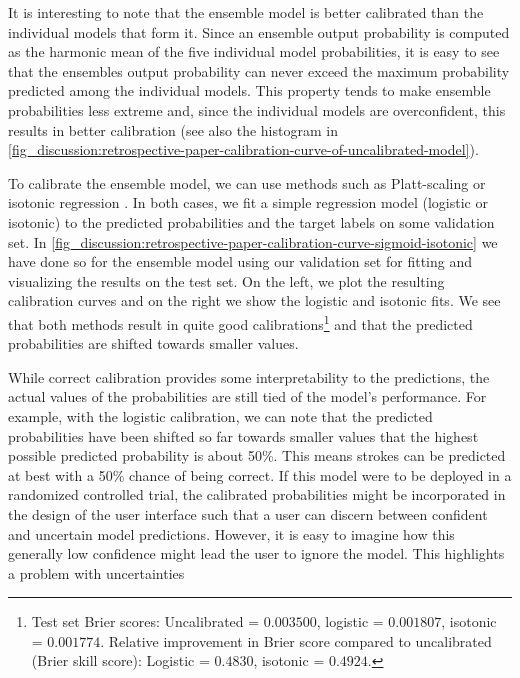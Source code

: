 It is interesting to note that the ensemble model is better calibrated than the individual models that form it. Since an ensemble output probability is computed as the harmonic mean of the five individual model probabilities, it is easy to see that the ensembles output probability can never exceed the maximum probability predicted among the individual models. This property tends to make ensemble probabilities less extreme and, since the individual models are overconfident, this results in better calibration (see also the histogram in \cref{fig_discussion:retrospective-paper-calibration-curve-of-uncalibrated-model}). 

To calibrate the ensemble model, we can use methods such as Platt-scaling \parencite{platt_probabilistic_1999} or isotonic regression \parencite{zadrozny_transforming_2002}. 
In both cases, we fit a simple regression model (logistic or isotonic) to the predicted probabilities and the target labels on some validation set. 
In \cref{fig_discussion:retrospective-paper-calibration-curve-sigmoid-isotonic} we have done so for the ensemble model using our validation set for fitting and visualizing the results on the test set. On the left, we plot the resulting calibration curves and on the right we show the logistic and isotonic fits. We see that both methods result in quite good calibrations\footnote{Test set Brier scores: Uncalibrated = $0.003500$, logistic = $0.001807$, isotonic = $0.001774$. Relative improvement in Brier score compared to uncalibrated (Brier skill score): Logistic = $0.4830$, isotonic = $0.4924$.} and that the predicted probabilities are shifted towards smaller values. 

While correct calibration provides some interpretability to the predictions, the actual values of the probabilities are still tied of the model's performance. For example, with the logistic calibration, we can note that the predicted probabilities have been shifted so far towards smaller values that the highest possible predicted probability is about 50\%. This means strokes can be predicted at best with a 50\% chance of being correct. 
If this model were to be deployed in a randomized controlled trial, the calibrated probabilities might be incorporated in the design of the user interface such that a user can discern between confident and uncertain model predictions. However, it is easy to imagine how this generally low confidence might lead the user to ignore the model. This highlights a problem with uncertainties


